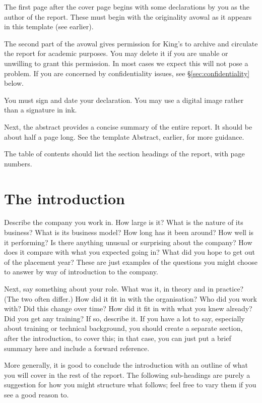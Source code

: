 \documentclass[12pt,a4paper,twoside,openright]{report}
\begin{document}
The first page after the cover page begins with some declarations by you as the author of the
report. These must begin with the originality avowal as it appears in this template (see earlier).

The second part of the avowal gives permission for King's to archive and circulate the report for
academic purposes.
You may delete it if you are unable or unwilling to grant this permission.
In most cases we expect this will not pose a problem.
If you are concerned by confidentiality issues, see \S\ref{sec:confidentiality} below.

You must sign and date your declaration. You may use a digital image rather than a signature in ink.

Next, the abstract provides a concise summary of the entire report.
It should be about half a page long. See the template Abstract, earlier, for more guidance.

The table of contents should list the section headings of the report, with page numbers.

\section{The introduction}

Describe the company you work in.
How large is it?
What is the nature of its business?
What is its business model?
How long has it been around?
How well is it performing?
Is there anything unusual or surprising about the company?
How does it compare with what you expected going in?
What did you hope to get out of the placement year?
These are just examples of the questions you might choose to answer by way of introduction
to the company.

Next, say something about your role.
What was it, in theory and in practice? (The two often differ.)
How did it fit in with the organisation?
Who did you work with? Did this change over time?
How did it fit in with what you knew already?
Did you get any training?
If so, describe it.
If you have a lot to say, especially about training or technical background,
you should create a separate section, after the introduction, to cover this;
in that case, you can just put a brief summary here and include a forward reference.

More generally, it is good to conclude the introduction with an outline of what you will
cover in the rest of the report.
The following sub-headings are purely a suggestion for how
you might structure what follows;
feel free to vary them if you see a good reason to.
\end{document}
